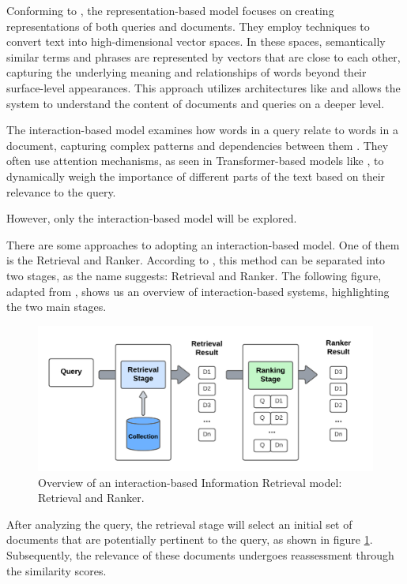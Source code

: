 Conforming to \citet{chen_integrating_2023}, the representation-based model focuses on creating representations of both queries and documents. They employ techniques to convert text into high-dimensional vector spaces. In these spaces, semantically similar terms and phrases are represented by vectors that are close to each other, capturing the underlying meaning and relationships of words beyond their surface-level appearances. This approach utilizes architectures like {\rnn} and allows the system to understand the content of documents and queries on a deeper level. 

The interaction-based model examines how words in a query relate to words in a document, capturing complex patterns and dependencies between them \cite{chen_integrating_2023}. They often use attention mechanisms, as seen in Transformer-based models like {\bert}, to dynamically weigh the importance of different parts of the text based on their relevance to the query.

However, only the interaction-based model will be explored.

There are some approaches to adopting an interaction-based model. One of them is the Retrieval and Ranker. According to \citet{hambarde_information_2023}, this method can be separated into two stages, as the name suggests: Retrieval and Ranker. The following figure, adapted from \citet{hambarde_information_2023}, shows us an overview of interaction-based {\ir} systems, highlighting the two main stages.

\begin{figure}[ht]
    \includegraphics[width=14cm]{figs/chapter2/IR_system.png}
    \centering
    \caption{Overview of an interaction-based Information Retrieval model: Retrieval and Ranker.}
    \label{fig_ir_system}
\end{figure}

After analyzing the query, the retrieval stage will select an initial set of documents that are potentially pertinent to the query, as shown in figure \ref{fig_ir_system}. Subsequently, the relevance of these documents undergoes reassessment through the similarity scores. 

